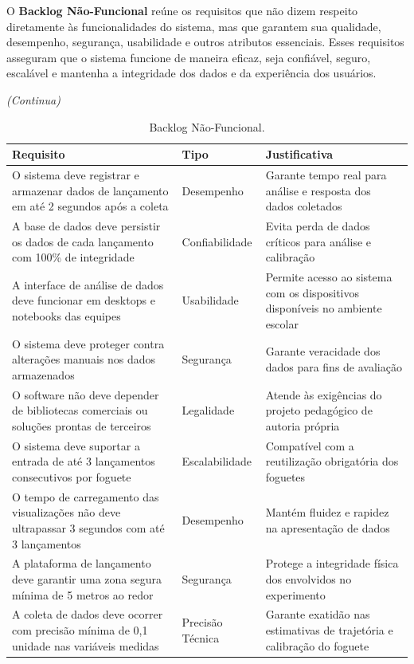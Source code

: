 O \textbf{Backlog Não-Funcional} reúne os requisitos que não dizem respeito diretamente às funcionalidades do sistema, mas que garantem sua qualidade, desempenho, segurança, usabilidade e outros atributos essenciais. Esses requisitos asseguram que o sistema funcione de maneira eficaz, seja confiável, seguro, escalável e mantenha a integridade dos dados e da experiência dos usuários.



\begin{table}[H]
    \caption{Backlog Não-Funcional.}
    \label{tab:backlog_nao_funcional}
    \hfill\textit{(Continua)}

    \centering
    \begin{tabular}{|p{5cm}|p{3cm}|p{6cm}|}
        \hline
        \textbf{Requisito} & \textbf{Tipo} & \textbf{Justificativa} \\
        \hline
        O sistema deve registrar e armazenar dados de lançamento em até 2 segundos após a coleta & Desempenho & Garante tempo real para análise e resposta dos dados coletados \\
        \hline
        A base de dados deve persistir os dados de cada lançamento com 100\% de integridade & Confiabilidade & Evita perda de dados críticos para análise e calibração \\
        \hline
        A interface de análise de dados deve funcionar em desktops e notebooks das equipes & Usabilidade & Permite acesso ao sistema com os dispositivos disponíveis no ambiente escolar \\
        \hline
        O sistema deve proteger contra alterações manuais nos dados armazenados & Segurança & Garante veracidade dos dados para fins de avaliação \\
        \hline
        O software não deve depender de bibliotecas comerciais ou soluções prontas de terceiros & Legalidade & Atende às exigências do projeto pedagógico de autoria própria \\
        \hline
         O sistema deve suportar a entrada de até 3 lançamentos consecutivos por foguete & Escalabilidade & Compatível com a reutilização obrigatória dos foguetes \\
        \hline
        O tempo de carregamento das visualizações não deve ultrapassar 3 segundos com até 3 lançamentos & Desempenho & Mantém fluidez e rapidez na apresentação de dados \\
        \hline
        A plataforma de lançamento deve garantir uma zona segura mínima de 5 metros ao redor & Segurança & Protege a integridade física dos envolvidos no experimento \\
        \hline
        A coleta de dados deve ocorrer com precisão mínima de 0,1 unidade nas variáveis medidas & Precisão Técnica & Garante exatidão nas estimativas de trajetória e calibração do foguete \\
        \hline
    \end{tabular}
\end{table}

